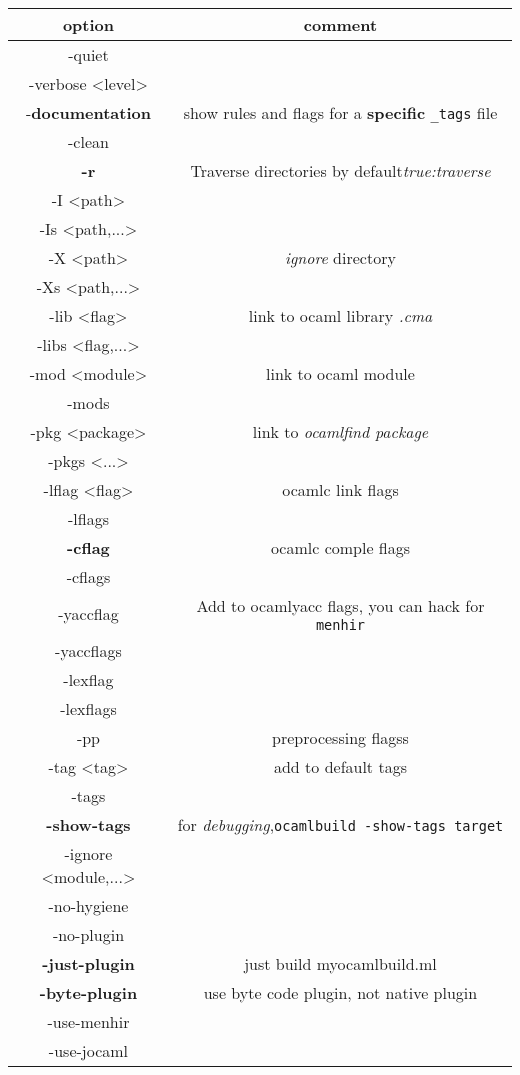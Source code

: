 \begin{longtable}{|c|c|}
  \hline
option & comment \\
  \endfirsthead
\hline
-quiet & \\
-verbose <level> & \\
-\textbf{documentation} & show rules and flags for a \textbf{specific} \verb|_tags| file
\\
-clean & \\
\textbf{-r} & Traverse directories by default\textit{true:traverse} \\
-I <path> & \\
-Is <path,...> & \\
-X <path> & \textit{ignore} directory \\
-Xs <path,...> & \\
-lib <flag> & link to ocaml library \textit{.cma} \\
-libs <flag,...> & \\
-mod <module> & link to ocaml module \\
-mods & \\
-pkg <package> & link to \textit{ocamlfind package} \\
-pkgs <...> & \\
-lflag  <flag> & ocamlc link flags \\
-lflags & \\
\textbf{-cflag} & ocamlc comple flags \\
-cflags & \\
-yaccflag &  Add to ocamlyacc flags, you can hack for \verb|menhir| \\
-yaccflags & \\
-lexflag & \\
-lexflags & \\
-pp & preprocessing flagss\\
-tag <tag> & add to default tags \\
-tags & \\
\textbf{-show-tags} & for \textit{debugging},\verb|ocamlbuild -show-tags target| \\
-ignore <module,...> & \\
-no-hygiene & \\
-no-plugin & \\
\textbf{-just-plugin} & just build myocamlbuild.ml \\
\textbf{-byte-plugin} & use byte code plugin, not native plugin\\
-use-menhir & \\
-use-jocaml & \\

\end{longtable}
